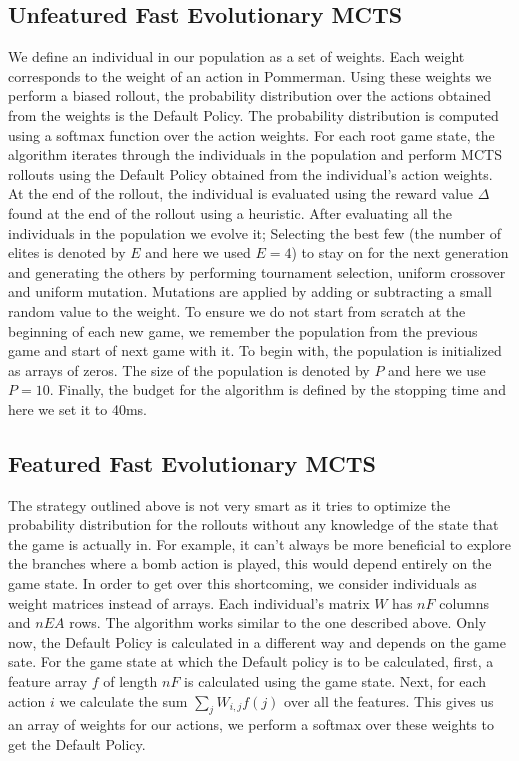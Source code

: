 \documentclass{llncs}
\begin{document}
\subsection{Unfeatured Fast Evolutionary MCTS}
We define an individual in our population as a set of weights. Each weight corresponds to the weight of an action in Pommerman. Using these weights we perform a biased rollout, the probability distribution over the actions obtained from the weights is the Default Policy. The probability distribution is computed using a softmax function over the action weights. For each root game state, the algorithm  iterates through the individuals in the population and perform MCTS rollouts using the Default Policy obtained from the individual's action weights. At the end of the rollout, the individual is evaluated using the reward value $\Delta$ found at the end of the rollout using a heuristic. After evaluating all the individuals in the population we evolve it; Selecting the best few (the number of elites is denoted by $E$ and here we used $E=4$) to stay on for the next generation and generating the others by performing tournament selection, uniform crossover and uniform mutation. Mutations are applied by adding or subtracting a small random value to the weight. To ensure we do not start from scratch at the beginning of each new game, we remember the population from the previous game and start of next game with it. To begin with, the population is initialized as arrays of zeros. The size of the population is denoted by $P$ and here we use $P=10$. Finally, the budget for the algorithm is defined by the stopping time and here we set it to 40ms.

\subsection{Featured Fast Evolutionary MCTS}
The strategy outlined above is not very smart as it tries to optimize the probability distribution for the rollouts without any knowledge of the state that the game is actually in. For example, it can't always be more beneficial to explore the branches where a bomb action is played, this would depend entirely on the game state. In order to get over this shortcoming, we consider individuals as weight matrices instead of arrays. Each individual's matrix $W$ has $nF$ columns and  $nEA$ rows. The algorithm works similar to the one described above. Only now, the Default Policy is calculated in a different way and depends on the game sate. For the game state at which the Default policy is to be calculated, first, a feature array $f$ of length $nF$ is calculated using the game state. Next, for each action $i$ we calculate the sum $\sum_{j} W_{i,j}f(j)$ over all the features. This gives us an array of weights for our actions, we perform a softmax over these weights to get the Default Policy. \\
\end{document}
